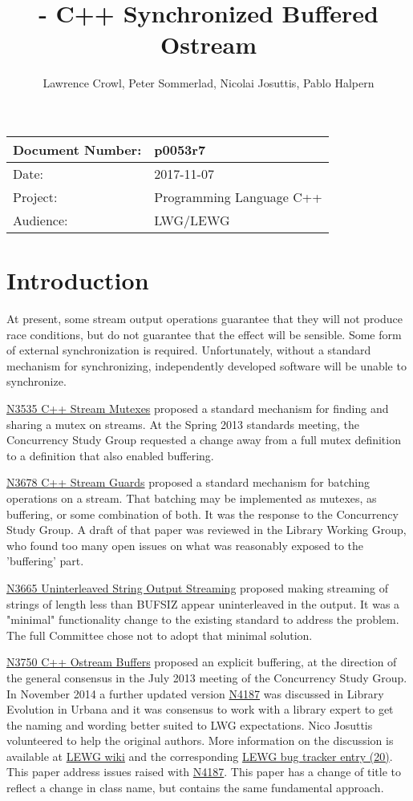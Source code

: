 \documentclass[ebook,11pt,article]{memoir}
\title{\papernumber{} - C++ Synchronized Buffered Ostream}
\author{Lawrence Crowl, Peter Sommerlad, Nicolai Josuttis, Pablo Halpern}
\date{\paperdate}                %
\newcommand{\papernumber}{p0053r7}
\newcommand{\paperdate}{2017-11-07}
\begin{document}
\maketitle
\begin{center}
\begin{tabular}[t]{|l|l|}\hline 
Document Number:&  \papernumber \\\hline
Date: & \paperdate \\\hline
Project: & Programming Language C++\\\hline 
Audience: & LWG/LEWG\\\hline
\end{tabular}
\end{center}
\chapter{Introduction}
At present, some stream output operations guarantee that they will not produce race conditions, but do not guarantee that the effect will be sensible. Some form of external synchronization is required. Unfortunately, without a standard mechanism for synchronizing, independently developed software will be unable to synchronize.

\href{https://wg21.link/n3535}{N3535 C++ Stream Mutexes} proposed a standard mechanism for finding and sharing a mutex on streams. At the Spring 2013 standards meeting, the Concurrency Study Group requested a change away from a full mutex definition to a definition that also enabled buffering.

\href{https://wg21.link/N3678}{N3678 C++ Stream Guards} proposed a standard mechanism for batching operations on a stream. That batching may be implemented as mutexes, as buffering, or some combination of both. It was the response to the Concurrency Study Group. A draft of that paper was reviewed in the Library Working Group, who found too many open issues on what was reasonably exposed to the 'buffering' part.

\href{https://wg21.link/N3665}{N3665 Uninterleaved String Output Streaming} proposed making streaming of strings of length less than BUFSIZ appear uninterleaved in the output. It was a "minimal" functionality change to the existing standard to address the problem. The full Committee chose not to adopt that minimal solution.

\href{https://wg21.link/N3750}{N3750 C++ Ostream Buffers} proposed an explicit buffering, at the direction of the general consensus in the July 2013 meeting of the Concurrency Study Group. In November 2014 a further updated version \href{https://wg21.link/N4187}{N4187} was discussed in Library Evolution in Urbana and it was consensus to work with a library expert to get the naming and wording better suited to LWG expectations. Nico Josuttis volunteered to help the original authors. More information on the discussion is available at \href{http://wiki.edg.com/twiki/bin/view/Wg21urbana-champaign/N4187}{LEWG wiki} and the corresponding \href{https://issues.isocpp.org/show_bug.cgi?id=20}{LEWG bug tracker entry (20)}. This paper address issues raised with \href{https://wg21.link/N4187}{N4187}. This paper has a change of title to reflect a change in class name, but contains the same fundamental approach.
\end{document}
